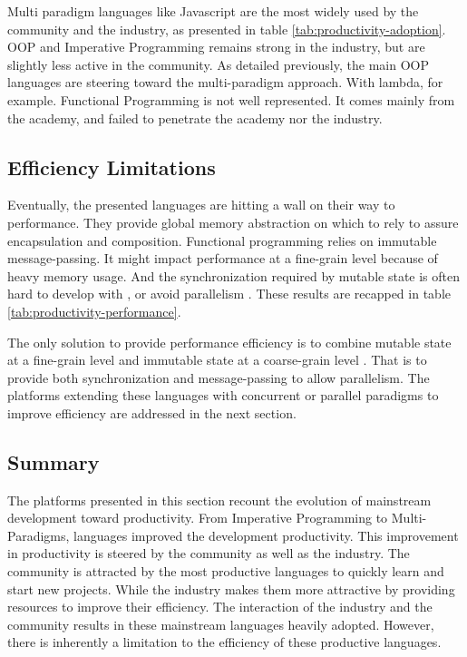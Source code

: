 Multi paradigm languages like Javascript are the most widely used by the community and the industry, as presented in table \ref{tab:productivity-adoption}.
OOP and Imperative Programming remains strong in the industry, but are slightly less active in the community.
As detailed previously, the main OOP languages are steering toward the multi-paradigm approach.
With lambda, for example.
Functional Programming is not well represented.
It comes mainly from the academy, and failed to penetrate the academy nor the industry.


\subsection{Efficiency Limitations} \label{chapter3:software-productivity:efficiency-limitations}

Eventually, the presented languages are hitting a wall on their way to performance.
They provide global memory abstraction on which to rely to assure encapsulation and composition. %
Functional programming relies on immutable message-passing.
It might impact performance at a fine-grain level because of heavy memory usage.
And the synchronization required by mutable state is often hard to develop with \cite{Adya2002}, or avoid parallelism \cite{Pai1999,Krohn2007}.
These results are recapped in table \ref{tab:productivity-performance}.


The only solution to provide performance efficiency is to combine mutable state at a fine-grain level and immutable state at a coarse-grain level .
That is to provide both synchronization and message-passing to allow parallelism.
The platforms extending these languages with concurrent or parallel paradigms to improve efficiency are addressed in the next section.

\subsection{Summary} \label{chapter3:software-productivity:summary}

The platforms presented in this section recount the evolution of mainstream development toward productivity.
From Imperative Programming to Multi-Paradigms, languages improved the development productivity.
This improvement in productivity is steered by the community as well as the industry.
The community is attracted by the most productive languages to quickly learn and start new projects.
While the industry makes them more attractive by providing resources to improve their efficiency.
The interaction of the industry and the community results in these mainstream languages heavily adopted.
However, there is inherently a limitation to the efficiency of these productive languages.

